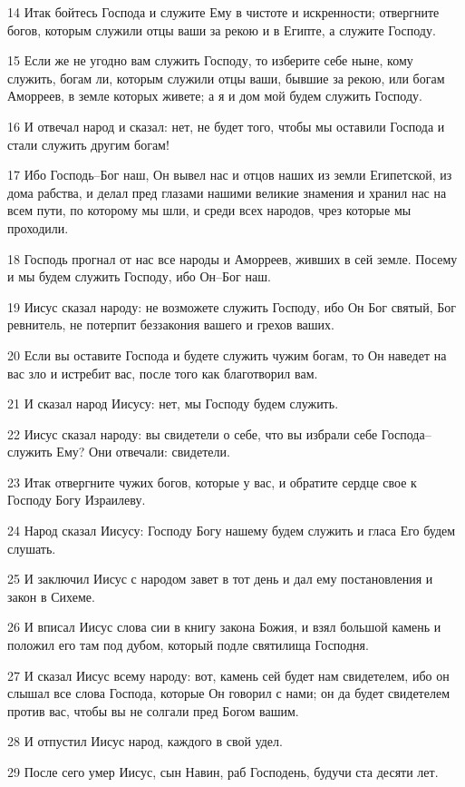 \par 14 Итак бойтесь Господа и служите Ему в чистоте и искренности; отвергните богов, которым служили отцы ваши за рекою и в Египте, а служите Господу.
\par 15 Если же не угодно вам служить Господу, то изберите себе ныне, кому служить, богам ли, которым служили отцы ваши, бывшие за рекою, или богам Аморреев, в земле которых живете; а я и дом мой будем служить Господу.
\par 16 И отвечал народ и сказал: нет, не будет того, чтобы мы оставили Господа и стали служить другим богам!
\par 17 Ибо Господь--Бог наш, Он вывел нас и отцов наших из земли Египетской, из дома рабства, и делал пред глазами нашими великие знамения и хранил нас на всем пути, по которому мы шли, и среди всех народов, чрез которые мы проходили.
\par 18 Господь прогнал от нас все народы и Аморреев, живших в сей земле. Посему и мы будем служить Господу, ибо Он--Бог наш.
\par 19 Иисус сказал народу: не возможете служить Господу, ибо Он Бог святый, Бог ревнитель, не потерпит беззакония вашего и грехов ваших.
\par 20 Если вы оставите Господа и будете служить чужим богам, то Он наведет на вас зло и истребит вас, после того как благотворил вам.
\par 21 И сказал народ Иисусу: нет, мы Господу будем служить.
\par 22 Иисус сказал народу: вы свидетели о себе, что вы избрали себе Господа--служить Ему? Они отвечали: свидетели.
\par 23 Итак отвергните чужих богов, которые у вас, и обратите сердце свое к Господу Богу Израилеву.
\par 24 Народ сказал Иисусу: Господу Богу нашему будем служить и гласа Его будем слушать.
\par 25 И заключил Иисус с народом завет в тот день и дал ему постановления и закон в Сихеме.
\par 26 И вписал Иисус слова сии в книгу закона Божия, и взял большой камень и положил его там под дубом, который подле святилища Господня.
\par 27 И сказал Иисус всему народу: вот, камень сей будет нам свидетелем, ибо он слышал все слова Господа, которые Он говорил с нами; он да будет свидетелем против вас, чтобы вы не солгали пред Богом вашим.
\par 28 И отпустил Иисус народ, каждого в свой удел.
\par 29 После сего умер Иисус, сын Навин, раб Господень, будучи ста десяти лет.
